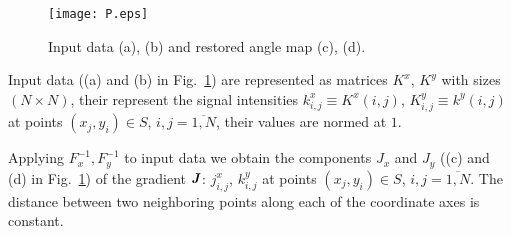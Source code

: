 \documentclass{beamer}
\begin{document}
\begin{frame}[c,allowframebreaks]
    \framebreak

    \begin{figure}
        \texttt{[image: P.eps]}
        \caption{Input data (a), (b) and restored angle map (c), (d).}
        {\label{fig:input_data}}%
    \end{figure}

    Input data ((a) and (b) in Fig.~\ref{fig:input_data}) are represented as matrices $K^x$, $K^y$
    with sizes $(N \times N)$, their represent the signal intensities $k^x_{i,j} \equiv K^x (i,j)$,
    $K^y_{i,j} \equiv k^y (i,j)$ at points $(x_j, y_i) \in S$, $i,j = \overline{1,N}$, their values
    are normed at $1$.

    Applying $F_x^{-1}, F_y^{-1}$ to input data we obtain the components $J_x$ and $J_y$
    ((c) and (d) in Fig.~\ref{fig:input_data}) of the gradient ${\textbf{\emph{J}}}$: $j^x_{i,j}$,
    $k^y_{i,j}$ at points $(x_j, y_i) \in S$, $i,j = \overline{1,N}$. The distance between two
    neighboring points along each of the coordinate axes is constant.

\end{frame}

\end{document}
